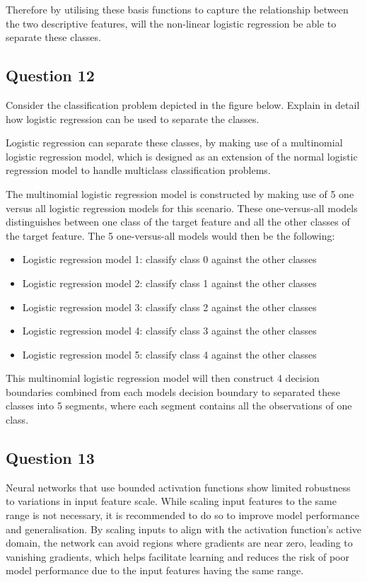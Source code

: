 \documentclass[10pt]{article}
\begin{document}
Therefore by utilising these basis functions to capture the relationship between the two descriptive features,
will the non-linear logistic regression be able to separate these classes.

\subsection*{Question 12}

Consider the classification problem depicted in the figure below. Explain in detail how logistic regression
can be used to separate the classes.

Logistic regression can separate these classes, by making use of a multinomial logistic regression model, which
is designed as an extension of the normal logistic regression model to handle multiclass classification problems.

The multinomial logistic regression model is constructed by making use of 5 one versus all logistic regression models
for this scenario. These one-versus-all models distinguishes between one class of the target feature and all the other
classes of the target feature. The 5 one-versus-all models would then be the following:
\begin{itemize}
    \item Logistic regression model 1: classify class 0 against the other classes
    \item Logistic regression model 2: classify class 1 against the other classes
    \item Logistic regression model 3: classify class 2 against the other classes
    \item Logistic regression model 4: classify class 3 against the other classes
    \item Logistic regression model 5: classify class 4 against the other classes
\end{itemize}
This multinomial logistic regression model will then construct 4 decision boundaries combined from each
models decision boundary to separated these classes into 5 segments, where each segment contains all the
observations of one class.

\subsection*{Question 13}

Neural networks that use bounded activation functions show limited robustness to variations in input feature scale.
While scaling input features to the same range is not necessary, it is recommended to do so to improve model
performance and generalisation. By scaling inputs to align with the activation function's active domain, the
network can avoid regions where gradients are near zero, leading to vanishing gradients, which helps facilitate
learning and reduces the risk of poor model performance due to the input features having the same range.
\end{document}
